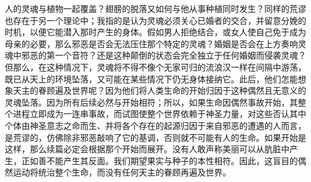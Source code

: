 人的灵魂与植物一起覆盖？翅膀的脱落又如何与他从事种植同时发生？同样的荒谬也存在于另一个理论中；我指的是认为灵魂必须关心已婚者的交合，并留意分娩的时机，以便它能潜入那时产生的身体。假如男人拒绝结合，或女人使自己免于成为母亲的必要，那么邪恶是否会无法压住那个特定的灵魂？婚姻是否会在上方奏响灵魂中邪恶的第一个音符？还是这种颠倒的状态会完全独立于任何婚姻而侵袭灵魂？但那么，在这种情况下，灵魂将不得不像个无家可归的流浪汉一样在间隔中游荡，既已从天上的环境坠落，又可能在某些情况下仍无身体接纳它。此后，他们怎能想象天主的眷顾遍及世界呢？因为他们将人类生命的开始归因于这种偶然且无意义的灵魂坠落。因为所有后续必然与开始相符；所以，如果生命因偶然事故开始，其整个进程立即成为一连串事故，而试图使整个世界依赖于神圣力量，对这些否认其中个体由神圣意志之命而生、并将各个存在的起源归因于来自邪恶的遭遇的人而言，是荒谬的，仿佛除非邪恶敲响了它的基调，否则就不可能有人的生命。如果开始是这样，那么续篇必定会根据那个开始而展开。没有人敢声称美丽可以从肮脏中产生，正如善不能产生其反面。我们期望果实与种子的本性相符。因此，这盲目的偶然运动将统治整个生命，而没有任何天主的眷顾再遍及世界。\par

